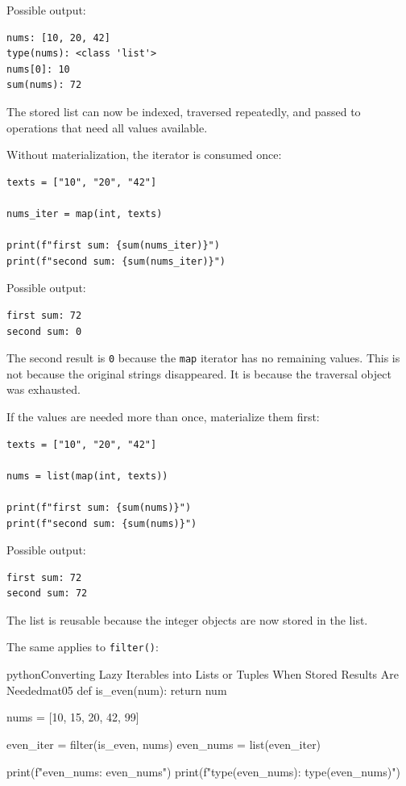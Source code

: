 \documentclass[a4paper,twoside]{report}
\begin{document}
Possible output:

\begin{verbatim}
nums: [10, 20, 42]
type(nums): <class 'list'>
nums[0]: 10
sum(nums): 72
\end{verbatim}

The stored list can now be indexed, traversed repeatedly, and passed to operations that need all values available.

Without materialization, the iterator is consumed once:

\begin{verbatim}
texts = ["10", "20", "42"]

nums_iter = map(int, texts)

print(f"first sum: {sum(nums_iter)}")
print(f"second sum: {sum(nums_iter)}")
\end{verbatim}

Possible output:

\begin{verbatim}
first sum: 72
second sum: 0
\end{verbatim}

The second result is \texttt{0} because the \texttt{map} iterator has no remaining values. This is not because the original strings disappeared. It is because the traversal object was exhausted.

If the values are needed more than once, materialize them first:

\begin{verbatim}
texts = ["10", "20", "42"]

nums = list(map(int, texts))

print(f"first sum: {sum(nums)}")
print(f"second sum: {sum(nums)}")
\end{verbatim}

Possible output:

\begin{verbatim}
first sum: 72
second sum: 72
\end{verbatim}

The list is reusable because the integer objects are now stored in the list.

The same applies to \texttt{filter()}:

\begin{codebox}[]{python}{Converting Lazy Iterables into Lists or Tuples When Stored Results Are Needed}{mat05}
def is_even(num):
    return num %

nums = [10, 15, 20, 42, 99]

even_iter = filter(is_even, nums)
even_nums = list(even_iter)

print(f"even_nums: {even_nums}")
print(f"type(even_nums): {type(even_nums)}")
\end{codebox}
\end{document}
